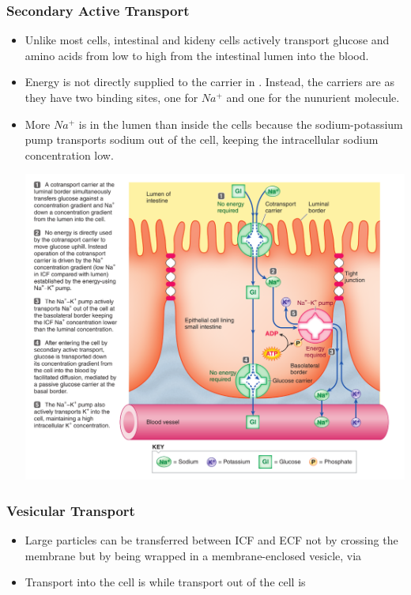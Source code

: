 \documentclass{article}
\numberwithin{equation}{section}
\begin{document}
\begin{itemize}
\begin{center}
    \end{center}
\end{itemize}
\subsubsection{Secondary Active Transport}
\begin{itemize}
    \item Unlike most cells, intestinal and kideny cells actively transport glucose and amino acids from low to high from the intestinal lumen into the blood.
    \item Energy is not directly supplied to the carrier in . Instead, the carriers are  as they have two binding sites, one for $Na^+$ and one for the nunurient molecule.
    \item More $Na^+$ is in the lumen than inside the cells because the sodium-potassium pump transports sodium out of the cell, keeping the intracellular sodium concentration low.
    \begin{center}
        \includegraphics[width=0.8\linewidth]{figures/secondary_active_transport.png}
    \end{center}
\end{itemize}
\subsubsection{Vesicular Transport}
\begin{itemize}
    \item Large particles can be transferred between ICF and ECF not by crossing the membrane but by being wrapped in a membrane-enclosed vesicle, via 
    \item Transport into the cell is  while transport out of the cell is 
\end{itemize}
\end{document}
